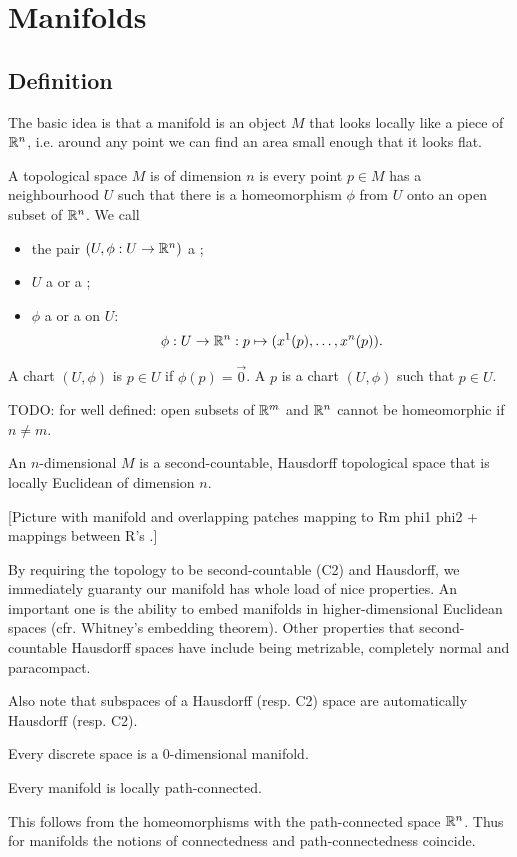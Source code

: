 \chapter{Manifolds}
\section{Definition}
The basic idea is that a manifold is an object $M$ that looks locally like a piece of $\mathbb{R}^n$, i.e. around any point we can find an area small enough that it looks flat.
\begin{definition}
A topological space $M$ is  of dimension $n$ is every point $p\in M$ has a neighbourhood $U$ such that there is a homeomorphism $\phi$ from $U$ onto an open subset of $\mathbb{R}^n$. We call
\begin{itemize}
\item the pair $(U,\phi:U\to \mathbb{R}^n)$ a ;
\item $U$ a  or a ;
\item $\phi$ a  or a  on $U$:
\[ \phi:U\to \mathbb{R}^n: p\mapsto (x^1(p), \ldots, x^n(p)). \]
\end{itemize}
A chart $(U,\phi)$ is  $p\in U$ if $\phi(p) = \vec{0}$. A  $p$ is a chart $(U,\phi)$ such that $p\in U$.
\end{definition}
TODO: for well defined: open subsets of $\mathbb{R}^m$ and $\mathbb{R}^n$ cannot be homeomorphic if $n\neq m$.
\begin{definition}
An $n$-dimensional  $M$ is a second-countable, Hausdorff topological space that is locally Euclidean of dimension $n$.
\end{definition}
[Picture with manifold and overlapping patches mapping to Rm phi1 phi2 + mappings between R's .]

By requiring the topology to be second-countable (C2) and Hausdorff, we immediately guaranty our manifold has whole load of nice properties. An important one is the ability to embed manifolds in higher-dimensional Euclidean spaces (cfr. Whitney's embedding theorem). Other properties that second-countable Hausdorff spaces have include being metrizable, completely normal and paracompact.

Also note that subspaces of a Hausdorff (resp. C2) space are automatically Hausdorff (resp. C2).

\begin{proposition}
Every discrete space is a $0$-dimensional manifold.
\end{proposition}
\begin{lemma}
Every manifold is locally path-connected.
\end{lemma}
This follows from the homeomorphisms with the path-connected space $\mathbb{R}^n$. Thus for manifolds the notions of connectedness and path-connectedness coincide.

